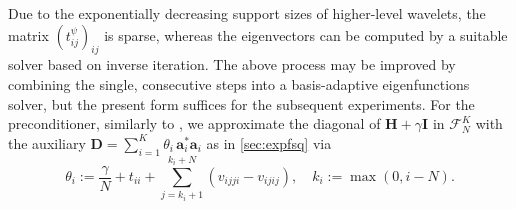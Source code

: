 \documentclass[a4paper,11pt,oneside]{amsart}
\theoremstyle{definition}
\theoremstyle{remark}
\newcommand{\ten}[1]{\boldsymbol{#1}}
\numberwithin{equation}{section}
\numberwithin{theorem}{section}
\begin{document}
Due to the exponentially decreasing support sizes of higher-level wavelets, the matrix $(t^\psi_{ij})_{ij}$ is sparse, whereas the eigenvectors can be computed by a suitable solver based on inverse iteration. The above process may be improved by combining the single, consecutive steps into a basis-adaptive eigenfunctions solver, but the present form suffices for the subsequent experiments.
For the preconditioner, similarly to \cite{MG22}, we approximate the diagonal of $\ten H + \gamma \ten I$ in $\mathcal{F}_N^K$ with the auxiliary $\ten D = \sum_{i = 1}^K \theta_{i}\, \ten a_i^\ast \ten a_i$ as in \cref{sec:expfsq} via
%
%
\begin{equation*}
 \theta_i := \frac{\gamma}{N} + t_{ii} + \sum_{j = k_i + 1}^{k_i + N} (v_{ijji} - v_{ijij}), \quad k_i := \max(0,i-N).
\end{equation*}
\end{document}
